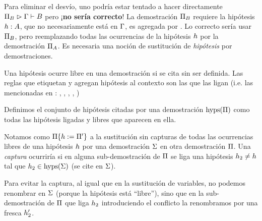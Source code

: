 Para eliminar el desvío, uno podría estar tentado a hacer directamente $\Pi_B \vartriangleright \Gamma \vdash B$ pero ¡\textbf{no sería correcto}! La demostración $\Pi_B$ requiere la hipótesis $h : A$, que no necesariamente está en $\Gamma$, es agregada por . Lo correcto sería usar $\Pi_B$, pero reemplazando todas las ocurrencias de la hipótesis $h$ por la demostración $\Pi_A$. Es necesaria una noción de sustitución de \textit{hipótesis} por demostraciones.

\begin{definition}
    Una hipótesis ocurre libre en una demostración si se cita sin ser definida. Las reglas que etiquetan y agregan hipótesis al contexto son las que las ligan (i.e. las mencionadas en : , , , , )
\end{definition}

\begin{definition}
    Definimos el conjunto de hipótesis citadas por una demostración $\textrm{hyps}(\Pi)$ como todas las hipótesis ligadas y libres que aparecen en ella.
\end{definition}

\begin{definition}
    Notamos como \(\Pi \{h := \Pi'\}\) a la sustitución sin capturas de todas las ocurrencias libres de una hipótesis $h$ por una demostración $\Sigma$ en otra demostración $\Pi$. Una \textit{captura} ocurriría si en alguna sub-demostración de $\Pi$ se liga una hipótesis $h_2 \neq h$ tal que $h_2 \in \textrm{hyps}(\Sigma)$ (se cite en $\Sigma$).
    
    Para evitar la captura, al igual que en la sustitución de variables, no podemos renombrar en $\Sigma$ (porque la hipótesis está ``libre''), sino que en la sub-demostración de $\Pi$ que liga $h_2$ introduciendo el conflicto la renombramos por una fresca $h_2'$.
\end{definition}



